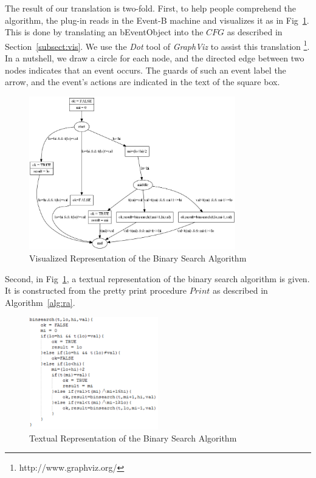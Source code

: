 \documentclass{easychair}
\begin{document}
The result of our translation is two-fold. First, to help people comprehend the algorithm, the plug-in reads in the Event-B machine and visualizes it as in Fig~\ref{fig:pix}. This is done by translating an bEventObject into the $CFG$ as described in Section~\ref{subsect:vis}. We use the \textit{Dot} tool of \textit{GraphViz} to assist this translation \footnote{http://www.graphviz.org/}. In a nutshell, we draw a circle for each node, and the directed edge between two nodes indicates that an event occurs. The guards of such an event label the arrow, and the event's actions are indicated in the text of the square box. 

\begin{figure}[!h]
  \centering
    \includegraphics[width=0.8\textwidth]{img/pix.jpg}
  \caption{Visualized Representation of the Binary Search Algorithm}
  \label{fig:pix}
\end{figure}

Second, in Fig~\ref{fig:pix}, a textual representation of the binary search algorithm is given. It is constructed from the pretty print procedure $Print$ as described in Algorithm~\ref{alg:ra}.
\begin{figure}[!h]
  \centering
    \includegraphics[width=0.5\textwidth]{img/alg.jpg}
  \caption{Textual Representation of the Binary Search Algorithm}
  \label{fig:alg}
\end{figure}
\newpage



\end{document}

